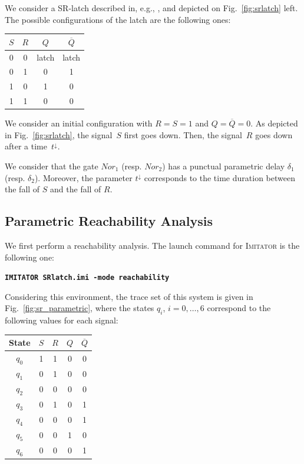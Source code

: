 \documentclass[a4paper,10pt]{article}
\newcommand{\imitator}{\textsc{Imitator}}
\newcommand{\imitatorExec}{\code{IMITATOR}}
\newcommand{\code}[1]{\textbf{\texttt{#1}}}
\begin{document}
We consider a SR-latch described in, e.g., \cite{hh07}, and depicted on Fig.~\ref{fig:srlatch} left.
The possible configurations of the latch are the following ones:

\smallskip

{

\centering

\begin{tabular}{|c|c|c|c|}
	\hline
	$S$ & $R$ & $Q$ & $\overline{Q}$ \\
	\hline
	0 & 0 & latch & latch \\
	\hline
	0 & 1 & 0 & 1 \\
	\hline
	1 & 0 & 1 & 0 \\
	\hline
	1 & 1 & 0 & 0 \\
	\hline
\end{tabular}

}

\medskip

We consider an initial configuration with $R = S = 1$ and $Q = \overline{Q} = 0$.
As depicted in Fig.~\ref{fig:srlatch}, the signal~$S$ first goes down.
Then, the signal~$R$ goes down after a time~$t^\downarrow$.


We consider that the gate $\mathit{Nor}_1$ (resp. $\mathit{Nor}_2$) has a punctual parametric delay $\delta_1$ (resp. $\delta_2$).
Moreover, the parameter $t^\downarrow$ corresponds to the time duration between the fall of $S$ and the fall of $R$.


\subsection{Parametric Reachability Analysis}

We first perform a reachability analysis.
The launch command for \imitator{} is the following one:

\code{\imitatorExec{} SRlatch.imi -mode reachability}

Considering this environment, the trace set of this system is given in Fig.~\ref{fig:sr_parametric}, where the states $q_i$, $i = 0, \dots, 6$ correspond to the following values for each signal:

\smallskip

{

\centering

\begin{tabular}{|c||c|c|c|c|}
	\hline
	State & $S$ & $R$ & $Q$ & $\overline{Q}$ \\
	\hline
	$q_0$ & 1 & 1 & 0 & 0 \\
	\hline
	$q_1$ & 0 & 1 & 0 & 0 \\
	\hline
	$q_2$ & 0 & 0 & 0 & 0 \\
	\hline
	$q_3$ & 0 & 1 & 0 & 1 \\
	\hline
	$q_4$ & 0 & 0 & 0 & 1 \\
	\hline
	$q_5$ & 0 & 0 & 1 & 0 \\
	\hline
	$q_6$ & 0 & 0 & 0 & 1 \\
	\hline
\end{tabular}

}
\end{document}
